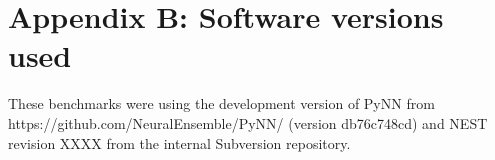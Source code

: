 \documentclass{frontiersSCNS} %
\begin{document}
\section*{Appendix B: Software versions used}

These benchmarks were using the development version of PyNN from 
https://github.com/NeuralEnsemble/PyNN/ (version db76c748cd) and NEST
revision XXXX from the internal Subversion repository.




\end{document}
